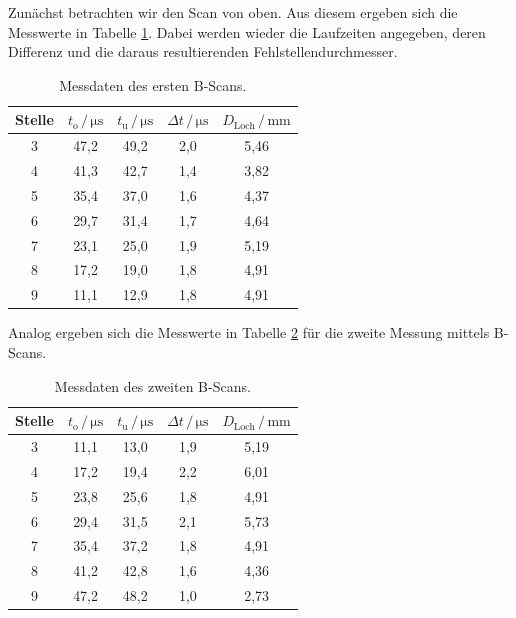 Zunächst betrachten wir den Scan von oben. Aus diesem ergeben sich die Messwerte in Tabelle \ref{tab:mess3}.
Dabei werden wieder die Laufzeiten angegeben, deren Differenz und die daraus resultierenden 
Fehlstellendurchmesser.  

\begin{table}
\centering
\caption{Messdaten des ersten B-Scans.}
\label{tab:mess3}
\begin{tabular}{c c c c c}
\toprule
Stelle & $t_\text{o} \,/\, \si{\micro\second}$ & $t_\text{u} \,/\, \si{\micro\second}$ &$\Delta t \,/\, \si{\micro\second}$ & $D_\text{Loch} \,/\, \si{\milli\meter}$\\
\midrule 
3 & 47,2 & 49,2 & 2,0 & 5,46\\
4 & 41,3 & 42,7 & 1,4 & 3,82\\
5 & 35,4 & 37,0 & 1,6 & 4,37\\
6 & 29,7 & 31,4 & 1,7 & 4,64\\
7 & 23,1 & 25,0 & 1,9 & 5,19\\
8 & 17,2 & 19,0 & 1,8 & 4,91\\
9 & 11,1 & 12,9 & 1,8 & 4,91\\
\bottomrule
\end{tabular}
\end{table}

Analog ergeben sich die Messwerte in Tabelle \ref{tab:mess4} für die zweite Messung mittels B-Scans.

\begin{table}
\centering
\caption{Messdaten des zweiten B-Scans.}
\label{tab:mess4}
\begin{tabular}{c c c c c}
\toprule
Stelle & $t_\text{o} \,/\, \si{\micro\second}$ & $t_\text{u} \,/\, \si{\micro\second}$ &$\Delta t \,/\, \si{\micro\second}$ & $D_\text{Loch} \,/\, \si{\milli\meter}$\\
\midrule 
3 & 11,1 & 13,0 & 1,9 & 5,19\\
4 & 17,2 & 19,4 & 2,2 & 6,01\\
5 & 23,8 & 25,6 & 1,8 & 4,91\\
6 & 29,4 & 31,5 & 2,1 & 5,73\\
7 & 35,4 & 37,2 & 1,8 & 4,91\\
8 & 41,2 & 42,8 & 1,6 & 4,36\\
9 & 47,2 & 48,2 & 1,0 & 2,73\\
\bottomrule
\end{tabular}
\end{table}

